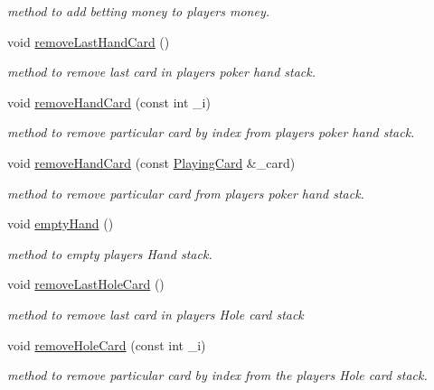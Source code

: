 \begin{DoxyCompactItemize}
\begin{DoxyCompactList}\small\item\em method to add betting money to players money. \end{DoxyCompactList}\item 
void \hyperlink{classplayer_a41b6b7f8937227b2d0a50c4de9d21165}{remove\-Last\-Hand\-Card} ()
\begin{DoxyCompactList}\small\item\em method to remove last card in players poker hand stack. \end{DoxyCompactList}\item 
void \hyperlink{classplayer_a326402ea79637f32e518800891a869db}{remove\-Hand\-Card} (const int \-\_\-i)
\begin{DoxyCompactList}\small\item\em method to remove particular card by index from players poker hand stack. \end{DoxyCompactList}\item 
void \hyperlink{classplayer_aafb28918145ad1d37a3b8309ecd59831}{remove\-Hand\-Card} (const \hyperlink{classPlayingCard}{Playing\-Card} \&\-\_\-card)
\begin{DoxyCompactList}\small\item\em method to remove particular card from players poker hand stack. \end{DoxyCompactList}\item 
void \hyperlink{classplayer_a74c3f50d0cf6f7b6870a9c7ae51526ac}{empty\-Hand} ()
\begin{DoxyCompactList}\small\item\em method to empty players Hand stack. \end{DoxyCompactList}\item 
void \hyperlink{classplayer_afaf3afa25cebc616d037d8bf80f606bb}{remove\-Last\-Hole\-Card} ()
\begin{DoxyCompactList}\small\item\em method to remove last card in players Hole card stack \end{DoxyCompactList}\item 
void \hyperlink{classplayer_a71ff3c2a4096a35ab36ba74a3df1a3bc}{remove\-Hole\-Card} (const int \-\_\-i)
\begin{DoxyCompactList}\small\item\em method to remove particular card by index from the players Hole card stack. \end{DoxyCompactList}\item 

\end{DoxyCompactItemize}
